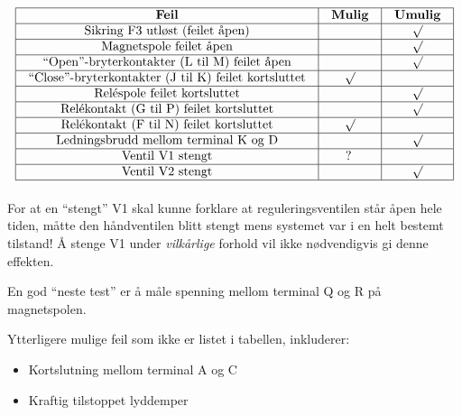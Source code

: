 

$$\vbox{\offinterlineskip
\halign{\strut
\vrule \quad\hfil # \ \hfil & 
\vrule \quad\hfil # \ \hfil & 
\vrule \quad\hfil # \ \hfil \vrule \cr
\noalign{\hrule}
%
{\bf Feil} & {\bf Mulig} & {\bf Umulig} \cr
%
\noalign{\hrule}
%
Sikring F3 utløst (feilet åpen) &  & $\surd$ \cr
%
\noalign{\hrule}
%
Magnetspole feilet åpen &  & $\surd$ \cr
%
\noalign{\hrule}
%
``Open''-bryterkontakter (L til M) feilet åpen &  & $\surd$ \cr
%
\noalign{\hrule}
%
``Close''-bryterkontakter (J til K) feilet kortsluttet & $\surd$ &  \cr
%
\noalign{\hrule}
%
Reléspole feilet kortsluttet &  & $\surd$ \cr
%
\noalign{\hrule}
%
Relékontakt (G til P) feilet kortsluttet &  & $\surd$ \cr
%
\noalign{\hrule}
%
Relékontakt (F til N) feilet kortsluttet & $\surd$ &  \cr
%
\noalign{\hrule}
%
Ledningsbrudd mellom terminal K og D &  & $\surd$ \cr
%
\noalign{\hrule}
%
Ventil V1 stengt & ? &  \cr
%
\noalign{\hrule}
%
Ventil V2 stengt &  & $\surd$ \cr
%
\noalign{\hrule}
} %
}$$ %

For at en ``stengt'' V1 skal kunne forklare at reguleringsventilen står åpen hele tiden, måtte den håndventilen blitt stengt mens systemet var i en helt bestemt tilstand! Å stenge V1 under {\it vilkårlige} forhold vil ikke nødvendigvis gi denne effekten.

\vskip 10pt

En god ``neste test'' er å måle spenning mellom terminal Q og R på magnetspolen.







Ytterligere mulige feil som ikke er listet i tabellen, inkluderer:

\begin{itemize}
\item{} Kortslutning mellom terminal A og C 
\item{} Kraftig tilstoppet lyddemper
\end{itemize}









